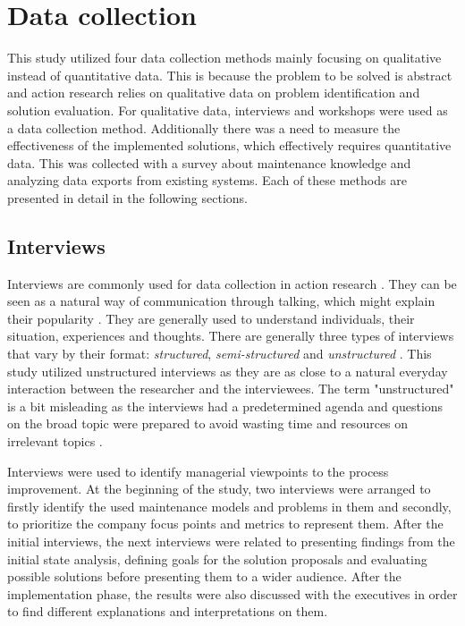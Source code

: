 \section{Data collection}

This study utilized four data collection methods mainly focusing on qualitative instead of quantitative data. This is because the problem to be solved is abstract and
action research relies on qualitative data on problem identification and solution evaluation. For qualitative data, interviews and workshops were used as a data collection
method. Additionally there was a need to measure the effectiveness of the implemented solutions, which effectively requires quantitative data. This was collected with a
survey about maintenance knowledge and analyzing data exports from existing systems. Each of these methods are presented in detail in the following sections.

\subsection{Interviews}

Interviews are commonly used for data collection in action research \citep{Easterbrook2008}. They can be seen as a natural way of communication through talking, which might
explain their popularity \citep{Doody2013}. They are generally used to understand individuals, their situation, experiences
and thoughts. There are generally three types of interviews that vary by their format: \emph{structured}, \emph{semi-structured} and \emph{unstructured} \citep{Doody2013}.
This study utilized unstructured interviews as they are as close to a natural everyday interaction between the researcher and the interviewees. The term "unstructured" is a bit
misleading as the interviews had a predetermined agenda and questions on the broad topic were prepared to avoid wasting time and resources on
irrelevant topics \citep{Doody2013}.

Interviews were used to identify managerial viewpoints to the process improvement. At the beginning of the study, two interviews were arranged to firstly identify the used maintenance
models and problems in them and secondly, to prioritize the company focus points and metrics to represent them. After the initial interviews, the next interviews were related to
presenting findings from the initial state analysis, defining goals for the solution proposals and evaluating possible solutions before presenting them to a wider audience. After the implementation
phase, the results were also discussed with the executives in order to find different explanations and interpretations on them.

